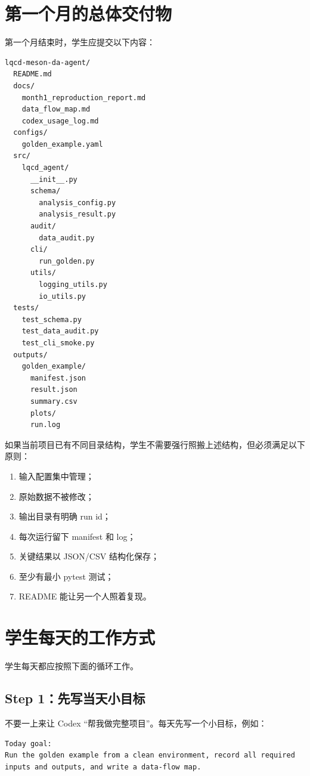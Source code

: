 \documentclass[11pt,a4paper,fontset=fandol]{ctexart}
\begin{document}
\section{第一个月的总体交付物}

第一个月结束时，学生应提交以下内容：

\begin{lstlisting}
lqcd-meson-da-agent/
  README.md
  docs/
    month1_reproduction_report.md
    data_flow_map.md
    codex_usage_log.md
  configs/
    golden_example.yaml
  src/
    lqcd_agent/
      __init__.py
      schema/
        analysis_config.py
        analysis_result.py
      audit/
        data_audit.py
      cli/
        run_golden.py
      utils/
        logging_utils.py
        io_utils.py
  tests/
    test_schema.py
    test_data_audit.py
    test_cli_smoke.py
  outputs/
    golden_example/
      manifest.json
      result.json
      summary.csv
      plots/
      run.log
\end{lstlisting}

如果当前项目已有不同目录结构，学生不需要强行照搬上述结构，但必须满足以下原则：

\begin{enumerate}[leftmargin=2em]
  \item 输入配置集中管理；
  \item 原始数据不被修改；
  \item 输出目录有明确 run id；
  \item 每次运行留下 manifest 和 log；
  \item 关键结果以 JSON/CSV 结构化保存；
  \item 至少有最小 pytest 测试；
  \item README 能让另一个人照着复现。
\end{enumerate}

\section{学生每天的工作方式}

学生每天都应按照下面的循环工作。

\subsection{Step 1：先写当天小目标}

不要一上来让 Codex “帮我做完整项目”。每天先写一个小目标，例如：

\begin{lstlisting}
Today goal:
Run the golden example from a clean environment, record all required inputs and outputs, and write a data-flow map.
\end{lstlisting}
\end{document}
